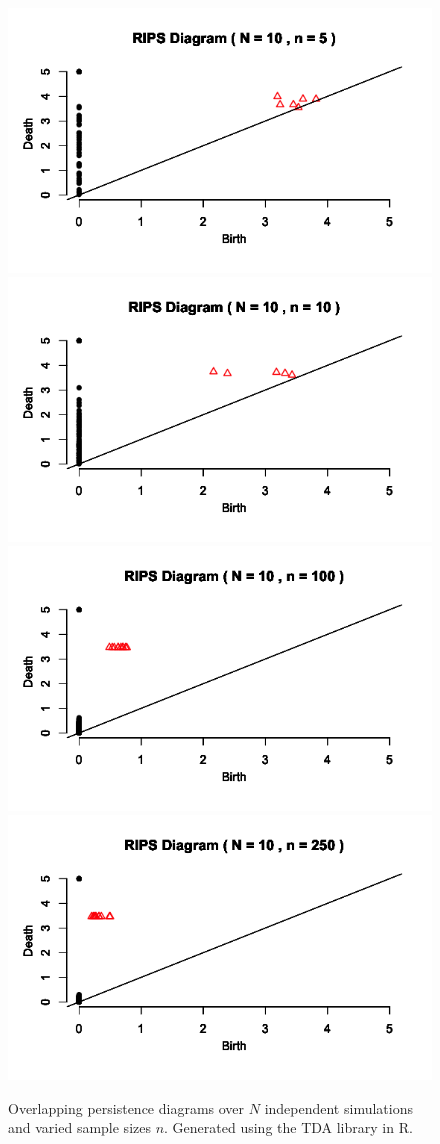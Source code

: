 \documentclass[12pt]{article}
\begin{document}
\begin{figure}[!htb]
  \includegraphics[width=0.8\linewidth]{RIPS_5n.png}
\endminipage\hfill
{}
  \includegraphics[width=0.8\linewidth]{RIPS_10n.png}
\endminipage\hfill
{}
  \includegraphics[width=0.8\linewidth]{RIPS_n100.png}
\endminipage\hfill
{}
  \includegraphics[width=0.8\linewidth]{RIPS_n250.png}
\endminipage\hfill
\caption{Overlapping persistence diagrams over $N$ independent simulations and varied sample sizes $n$. Generated using the TDA library in R.}
\end{figure}
\end{document}
